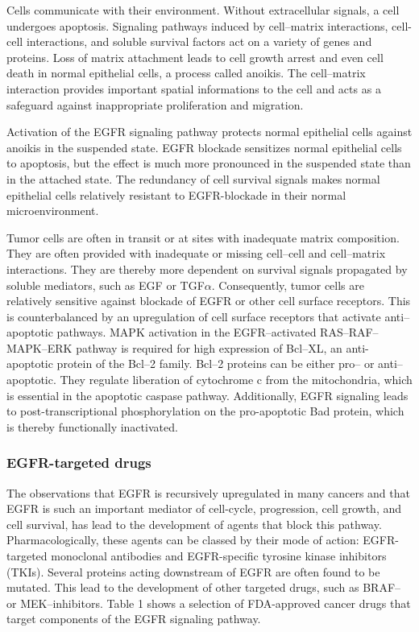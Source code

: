{{        Cells communicate with their environment. Without extracellular signals,
        a cell undergoes apoptosis. Signaling pathways induced by cell--matrix
        interactions, cell-cell interactions, and soluble survival factors act
        on a variety of genes and proteins. Loss of matrix attachment leads to
        cell growth arrest and even cell death in normal epithelial cells, a
        process called anoikis. The cell--matrix interaction provides important
        spatial informations to the cell and acts as a safeguard against
        inappropriate proliferation and migration.

        Activation of the EGFR signaling pathway protects normal
        epithelial cells against anoikis in the suspended state. EGFR blockade
        sensitizes normal epithelial cells to apoptosis, but the effect is much
        more pronounced in the suspended state than in the attached state. The
        redundancy of cell survival signals makes normal epithelial cells
        relatively resistant to EGFR-blockade in their normal microenvironment.

        Tumor cells are often in transit or at sites with inadequate matrix
        composition. They are often provided with inadequate or missing
        cell--cell and cell--matrix interactions. They are thereby more dependent
        on survival signals propagated by soluble mediators, such as EGF or
        TGF$\alpha$. Consequently, tumor cells are relatively sensitive against
        blockade of EGFR or other cell surface receptors. This is counterbalanced by an upregulation of cell
        surface receptors that activate anti--apoptotic pathways. MAPK
        activation in the EGFR--activated RAS--RAF--MAPK--ERK pathway is
        required for high expression of Bcl--XL, an anti-apoptotic protein of
        the Bcl--2 family. Bcl--2 proteins can be either pro-- or
        anti--apoptotic. They regulate liberation of cytochrome c from the
        mitochondria, which is essential in the apoptotic caspase pathway.
        Additionally, EGFR signaling leads to post-transcriptional
        phosphorylation on the pro-apoptotic Bad protein, which is thereby
        functionally inactivated.

    \subsubsection{EGFR-targeted drugs}

      The observations that EGFR is recursively upregulated in many cancers
      and that EGFR is such an important mediator of cell-cycle,
      progression, cell growth, and cell survival, has lead to the
      development of agents that block this pathway. Pharmacologically,
      these agents can be classed by their mode of action: EGFR-targeted
      monoclonal antibodies and EGFR-specific tyrosine kinase inhibitors (TKIs).
      Several proteins acting downstream of EGFR are often
      found to be mutated. This lead to the development of other targeted
      drugs, such as BRAF-- or MEK--inhibitors. Table 1 shows a selection
      of FDA-approved cancer drugs that target components of the EGFR signaling
      pathway.

}}
